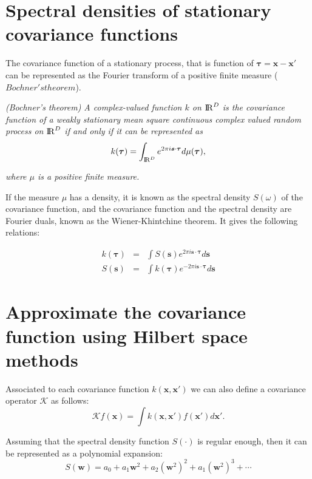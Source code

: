 \documentclass[]{interact}
\theoremstyle{plain}%
\theoremstyle{definition}
\theoremstyle{remark}
\begin{document}
\section{Spectral densities of stationary covariance functions}

The covariance function of a stationary process, that is function of $\bm{\tau}=\bm{x-x'}$ can be represented as the Fourier transform of a positive finite measure ($Bochner's theorem$). 

\vspace{0.2cm}
\textit{(Bochner’s theorem) A complex-valued function $k$ on ${\rm I\!R}^D$ is the covariance function of a weakly stationary mean square continuous complex valued random process on ${\rm I\!R}^D$ if and only if it can be represented as}
%
\begin{equation}
k(\bm{\tau})= \int_{{\rm I\!R}^D} e^{2\pi i \bm{s} \cdot \bm{\tau}} d\mu(\bm{\tau}), \nonumber 
\end{equation}

\textit{where $\mu$ is a positive finite measure.} 

\vspace{0.2cm}
If the measure $\mu$ has a density, it is known as the spectral density $S(\omega)$ of the covariance function, and the covariance function and the spectral density are Fourier duals, known as the Wiener-Khintchine theorem. It gives the following relations:

\begin{eqnarray}
k(\bm{\tau})&=& \int S(\bm{s}) e^{2\pi i \bm{s} \cdot \bm{\tau}} d\bm{s}  \nonumber \\
%
S(\bm{s})&=& \int k(\bm{\tau}) e^{-2\pi i \bm{s} \cdot \bm{\tau}} d\bm{s}  \nonumber
\end{eqnarray}

\section{Approximate the covariance function using Hilbert space methods}

Associated to each covariance function $k(\bm{x},\bm{x}')$ we can also define a covariance operator $\mathcal{K}$ as follows:
%
\begin{equation}
\mathcal{K} f(\bm{x}) = \int k(\bm{x},\bm{x}') f(\bm{x}') d\bm{x}'.
\end{equation} 

Assuming that the spectral density function $S(\cdot)$ is regular enough, then it can be represented as a polynomial expansion:
%
\begin{equation}
S(\bm{w})=a_0+a_1\bm{w}^2+a_2(\bm{w}^2)^2+a_1(\bm{w}^2)^3+\cdots
\end{equation}
\end{document}

